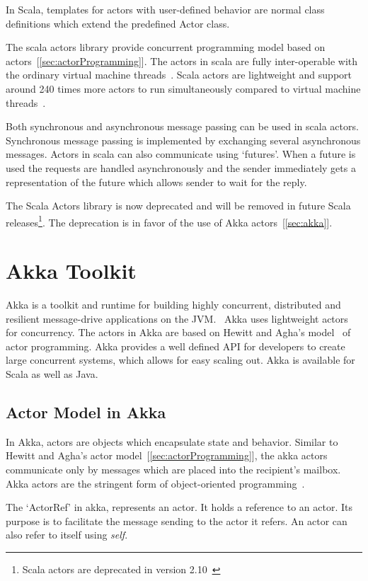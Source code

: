   In Scala, templates for actors with user-defined behavior are normal class definitions which extend the predefined Actor class.

  The scala actors library provide concurrent programming model based on actors~[\autoref{sec:actorProgramming}]. The actors in scala are fully inter-operable with the ordinary virtual machine threads~\cite{Haller}. Scala actors are lightweight and support around 240 times more actors to run simultaneously compared to virtual machine threads~\cite{Haller}.

  Both synchronous and asynchronous message passing can be used in scala actors. Synchronous message passing is implemented by exchanging several asynchronous messages. Actors in scala can also communicate using ‘futures’. When a future is used the requests are handled asynchronously and the sender immediately gets a representation of the future which allows sender to wait for the reply.~\cite{scalaActors}

  The Scala Actors library is now deprecated and will be removed in future Scala releases\footnote{Scala actors are deprecated in version 2.10~\cite{scalaActorsAPI}}. The deprecation is in favor of the use of Akka actors~[\autoref{sec:akka}].

\section{Akka Toolkit}
\label{sec:akka}
Akka is a toolkit and runtime for building highly concurrent, distributed and resilient message-drive applications on the JVM.~\cite{akkaHome} Akka uses lightweight actors for concurrency. The actors in Akka are based on Hewitt and Agha's model~\cite{agha, hewitt} of actor programming. Akka provides a well defined API for developers to create large concurrent systems, which allows for easy scaling out.
  Akka is available for Scala as well as Java.

  \subsection{Actor Model in Akka}
  In Akka, actors are objects which encapsulate state and behavior. Similar to Hewitt and Agha's actor model~[\autoref{sec:actorProgramming}], the akka actors communicate only by messages which are placed into the recipient’s mailbox. Akka actors are the stringent form of object-oriented programming~\cite{akkaActorSystem}.

  The ‘ActorRef’ in akka, represents an actor. It holds a reference to an actor. Its purpose is to facilitate the message sending to the actor it refers. An actor can also refer to itself using \emph{self}. ~\cite{akkaJavaDoc}

